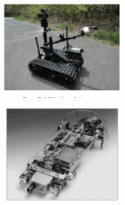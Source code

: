  \begin{figure}
	\centering
	\begin{minipage}{.5\textwidth}
		\centering
		\includegraphics[height=5cm,keepaspectratio]{Chapter2/fig/FukusimaRobot}
		\label{fig:fukuRobot}
	\end{minipage}%
	\begin{minipage}{.5\textwidth}
		\centering
		\includegraphics[width=1\linewidth,height=5cm,keepaspectratio]{Chapter2/fig/nero3}
		\label{fig:nero3}
	\end{minipage}
\end{figure}

   
